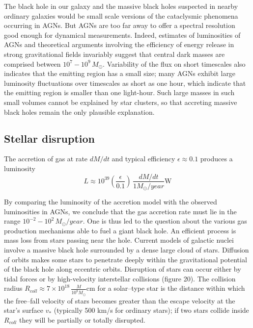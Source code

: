 \documentclass{lamuphys}
\begin{document}
The black hole in our galaxy and the massive black holes suspected in nearby 
ordinary galaxies would be small scale versions of the cataclysmic 
phenomena occurring in AGNs. But AGNs are too far away to offer a
spectral resolution good enough for dynamical measurements. Indeed, 
estimates of luminosities of AGNs and theoretical arguments involving 
the efficiency of energy release in strong gravitational fields 
invariably suggest that central dark masses are comprised between $10^{7} - 10^{9} \, M_{\odot}$. 
Variability of the flux on short timescales also 
indicates that the emitting region has a small size; many AGNs exhibit large
luminosity fluctuations over timescales as short as one hour, which indicate 
that the emitting region is smaller than one light-hour. Such large masses 
in such small volumes cannot be explained by star clusters, so that accreting massive
 black holes remain the only plausible explanation.

\subsection {Stellar disruption}

The accretion of gas at rate  $dM/dt$ and typical efficiency 
$\epsilon \approx 0.1$ 
produces a luminosity 
\begin{equation}
        L \approx 10^{39} (\frac{\epsilon}{0.1}) \, \frac{dM/dt}{1 
        M_{\odot}/year}\textrm{W}
\end{equation}  

By comparing the luminosity of the accretion model with the 
observed luminosities in AGNs, we conclude that the gas accretion rate 
must lie in the range $10^{-2}- 10^{2} \, M_{\odot}/year$. One is thus 
led to the question about the 
various gas production mechanisms able to fuel a giant black hole. An 
efficient process is mass loss from stars passing near the hole. 
Current models of galactic nuclei involve a massive black hole 
surrounded by a dense large cloud of stars. Diffusion of orbits makes 
some stars to penetrate deeply within the gravitational potential 
of the black hole along eccentric orbits. Disruption of stars can occur
either by tidal forces or 
by high-velocity interstellar collisions (figure 20). 
The collision radius $R_{coll} \approx 7 \times 10^{18} \,
\frac{M}{10^8 M_{\odot}}$cm
for a solar--type star is the distance within which the 
free--fall velocity of stars becomes greater than the escape velocity 
at the star's surface $v_{*}$ (typically 500 km/s for ordinary 
stars); if two stars collide inside $R_{coll}$ they will be 
partially or totally disrupted.
\end{document}
